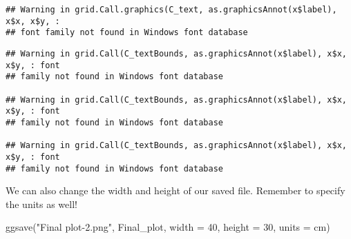 \documentclass[
]{book}
\newenvironment{Shaded}{\begin{snugshade}}{\end{snugshade}}
\newcommand{\AttributeTok}[1]{\textcolor[rgb]{0.77,0.63,0.00}{#1}}
\newcommand{\DecValTok}[1]{\textcolor[rgb]{0.00,0.00,0.81}{#1}}
\newcommand{\FunctionTok}[1]{\textcolor[rgb]{0.00,0.00,0.00}{#1}}
\newcommand{\NormalTok}[1]{#1}
\newcommand{\StringTok}[1]{\textcolor[rgb]{0.31,0.60,0.02}{#1}}
\begin{document}
\begin{verbatim}
## Warning in grid.Call.graphics(C_text, as.graphicsAnnot(x$label), x$x, x$y, :
## font family not found in Windows font database
\end{verbatim}

\begin{verbatim}
## Warning in grid.Call(C_textBounds, as.graphicsAnnot(x$label), x$x, x$y, : font
## family not found in Windows font database

## Warning in grid.Call(C_textBounds, as.graphicsAnnot(x$label), x$x, x$y, : font
## family not found in Windows font database

## Warning in grid.Call(C_textBounds, as.graphicsAnnot(x$label), x$x, x$y, : font
## family not found in Windows font database
\end{verbatim}

We can also change the width and height of our saved file. Remember to specify the units as well!

\begin{Shaded}
\begin{Highlighting}[]
\FunctionTok{ggsave}\NormalTok{(}\StringTok{"Final plot{-}2.png"}\NormalTok{, Final\_plot, }\AttributeTok{width =} \DecValTok{40}\NormalTok{, }\AttributeTok{height =} \DecValTok{30}\NormalTok{, }\AttributeTok{units =} \StringTok{\textquotesingle{}cm\textquotesingle{}}\NormalTok{)}
\end{Highlighting}
\end{Shaded}
\end{document}
